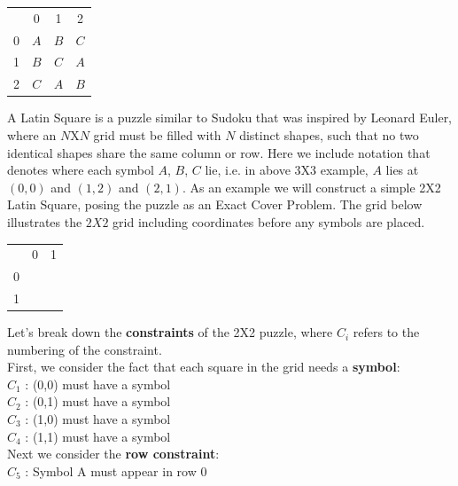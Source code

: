 \documentclass{article}
\begin{document}
\begin{center}
\begin{tabular}{cccc}
 & 0 & 1 & 2\\ \cline{2-4} 
\multicolumn{1}{c|}{0} & \multicolumn{1}{c|}{$A$} & \multicolumn{1}{c|}{$B$}& \multicolumn{1}{c|}{$C$} \\ \cline{2-4} 
\multicolumn{1}{c|}{1} & \multicolumn{1}{c|}{$B$} & \multicolumn{1}{c|}{$C$}& \multicolumn{1}{c|}{$A$} \\ \cline{2-4} 
\multicolumn{1}{c|}{2} & \multicolumn{1}{c|}{$C$} & \multicolumn{1}{c|}{$A$}& \multicolumn{1}{c|}{$B$} \\ \cline{2-4} 
\end{tabular}

\end{center}
A Latin Square is a puzzle similar to Sudoku that was inspired by Leonard Euler, where an $N$X$N$ grid must be filled with $N$ distinct shapes, such that no two identical shapes share the same column or row. Here we include notation that denotes where each symbol $A$, $B$, $C$ lie, i.e. in above 3X3 example, $A$ lies at $(0,0)$ and $(1,2)$ and $(2,1)$. As an example we will construct a simple 2X2 Latin Square, posing the puzzle as an Exact Cover Problem. The grid below illustrates the $2X2$ grid including coordinates before any symbols are placed.
\begin{center}
\begin{tabular}{ccc}
 & 0 & 1 \\ \cline{2-3} 
\multicolumn{1}{c|}{0} & \multicolumn{1}{c|}{} & \multicolumn{1}{c|}{} \\ \cline{2-3} 
\multicolumn{1}{c|}{1} & \multicolumn{1}{c|}{} & \multicolumn{1}{c|}{} \\ \cline{2-3} 
\end{tabular}
\end{center}
Let's break down the \textbf{constraints} of the 2X2 puzzle, where $C_i$ refers to the numbering of the constraint.\\
First, we consider the fact that each square in the grid needs a \textbf{symbol}:\\
$C_1$ :  (0,0) must have a symbol\\
$C_2$ :  (0,1) must have a symbol\\
$C_3$ :  (1,0) must have a symbol\\
$C_4$ :  (1,1) must have a symbol\\
Next we consider the \textbf{row constraint}:\\
$C_5$ :  Symbol A must appear in row 0\\
\end{document}
